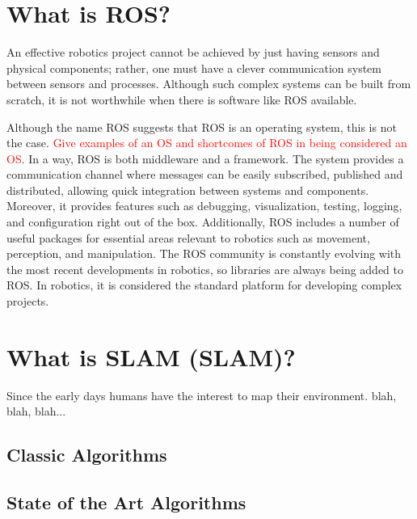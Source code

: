 \section{What is \acs{ROS}?}

An effective robotics project cannot be achieved by just having sensors and physical components; rather, one must have a clever communication system between sensors and processes. Although such complex systems can be built from scratch, it is not worthwhile when there is software like \acs*{ROS} available.

Although the name \acl*{ROS} suggests that ROS is an operating system, this is not the case. \textcolor{red}{Give examples of an OS and shortcomes of ROS in being considered an OS}.  In a way, \acs*{ROS} is both middleware and a framework. The system provides a communication channel where messages can be easily subscribed, published and distributed, allowing quick integration between systems and components. Moreover, it provides features such as debugging, visualization, testing, logging, and configuration right out of the box. Additionally, ROS includes a number of useful packages for essential areas relevant to robotics such as movement, perception, and manipulation. The ROS community is constantly evolving with the most recent developments in robotics, so libraries are always being added to ROS. In robotics, it is considered the standard platform for developing complex projects.

\section{What is \acl*{SLAM} (\acs*{SLAM})?}

Since the early days humans have the interest to map their environment. blah, blah, blah...

\subsection{Classic Algorithms}

\subsection{State of the Art Algorithms}